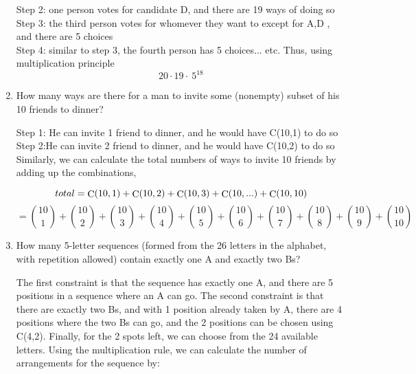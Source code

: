 \documentclass[12pt]{amsart}
\DeclareMathOperator{\comb}{C}
\begin{document}
\begin{enumerate}
Step 2: one person votes for candidate D, and there are 19 ways of doing so \\

Step 3: the third person votes for whomever they want to except for A,D , and there are 5 choices\\

Step 4: similar to step 3, the fourth person has 5 choices... etc. Thus, using multiplication principle\\
 \begin{displaymath}
    20\cdot19\cdot\  5^{18}
  \end{displaymath}
  
\bigskip
 \item 
 How many ways are there for a man to invite some (nonempty) subset of his
10 friends to dinner?

\bigskip 

Step 1: He can invite 1 friend to dinner, and he would have C(10,1) to do so \\ 

Step 2:He can invite 2 friend to dinner, and he would have C(10,2) to do so\\

Similarly, we can calculate the total numbers of ways to invite 10 friends by adding up the combinations,

 \begin{displaymath}
    total=\comb(10,1)+ \comb(10,2)+\comb(10,3)+\comb(10,...)+\comb(10,10)
    \newline  \end{displaymath}
\begin{displaymath}
 =\binom{10}{1} +\binom{10}{2}+\binom{10}{3}+\binom{10}{4}+\binom{10}{5}+\binom{10}{6}+\binom{10}{7}+\binom{10}{8}
    +\binom{10}{9} +\binom{10}{10}         
  \end{displaymath}
  
\bigskip

\item
 How many 5-letter sequences (formed from the 26 letters in the alphabet, with
repetition allowed) contain exactly one A and exactly two Bs?
\bigskip

The first constraint is that the sequence has exactly one A, and there are 5 positions in a sequence where an A can go. The second constraint is that there are exactly two Bs, and with 1 position already taken by A, there are 4 positions where the two Bs can go, and the 2 positions can be chosen using C(4,2). Finally, for the 2 spots left, we can choose from the 24 available letters. Using the multiplication rule, we can calculate the number of arrangements for the sequence by:
 

\end{enumerate}
\end{document}
